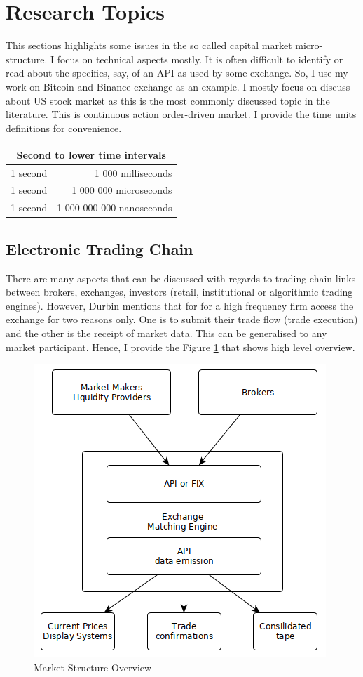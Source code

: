 \documentclass[12pt]{article}
\begin{document}
\section*{Research Topics}
This sections highlights some issues in the so called capital market micro-structure. I focus on technical aspects mostly. It is often difficult to identify or read about the specifics, say, of an API as used by some exchange. So, I use my work on Bitcoin and Binance exchange as an example. I mostly focus on discuss about US stock market as this is the most commonly discussed topic in the literature. This is continuous action order-driven market.  I provide the time units definitions for convenience.

\begin{center}
\begin{tabular}{|c|r|} 
\hline
\multicolumn{2}{|c|}{Second to lower time intervals} \\
\hline
1 second & 1 000 milliseconds \\ 
1 second & 1 000 000 microseconds \\ 
1 second & 1 000 000 000  nanoseconds \\ 
\hline
\end{tabular}
\end{center}


\subsection*{Electronic Trading Chain}
There are many aspects that can be discussed with regards to trading chain links between brokers, exchanges, investors (retail, institutional or algorithmic trading engines). However, Durbin \cite{durbin} mentions that for for a high frequency firm access the exchange for two reasons only. One is to submit their trade flow (trade execution) and the other is the receipt of market data. This can be generalised to any market participant. Hence, I provide the Figure \ref{fig:market} that shows high level overview.

\begin{figure}[h!]
	\centering
  \includegraphics[scale=0.6]{market.png}
  \caption{Market Structure Overview}
  \label{fig:market}
\end{figure}
\end{document}
